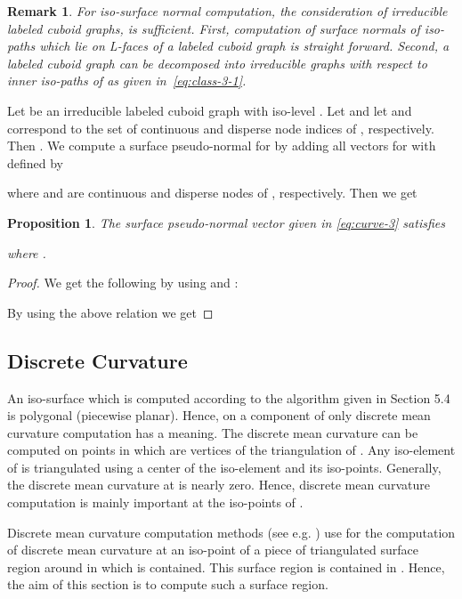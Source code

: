 \documentclass[a4paper,11pt]{article}
\newtheorem{proposition}[theorem]{Proposition}
\newtheorem{remark}[theorem]{Remark}
\begin{document}
\begin{remark} For iso-surface normal computation, the consideration of irreducible labeled cuboid graphs,
is sufficient. First, computation of surface normals of iso-paths which lie on L-faces of a labeled cuboid graph
is straight forward. Second, a labeled cuboid graph  can be decomposed into irreducible graphs with respect
to inner iso-paths of  as given in~\eqref{eq:class-3-1}.
\label{rem:second-remark}
\end{remark}

Let  be an irreducible labeled cuboid graph
with iso-level . Let  and let  and 
correspond to the set of continuous and disperse node indices of , respectively.
Then . We compute a surface pseudo-normal for  by adding all vectors
 for  with  defined by

where  and  are continuous and disperse nodes of , respectively.
Then we get

\begin{proposition}The surface pseudo-normal vector given in \eqref{eq:curve-3} satisfies

where .
\label{prop:curve-2}
\end{proposition}
\begin{proof}
We get the following by using  and  :

By using the above relation we get

\end{proof}

\subsection{Discrete Curvature}
An iso-surface  which is computed according to the algorithm given in Section 5.4 is polygonal
(piecewise planar). Hence, on a component  of  only discrete mean curvature computation
has a meaning. The discrete mean curvature can be computed on points in  which are vertices of the
triangulation of . Any iso-element of  is triangulated using a center 
of the iso-element and its iso-points. Generally, the discrete mean curvature at  is nearly zero. Hence,
discrete mean curvature computation is mainly important at the iso-points of .

Discrete mean curvature computation methods (see e.g. \cite{Meyer02Vismath}) use for the computation of
discrete mean curvature at an iso-point  of  a piece of triangulated surface region around  in
which  is contained. This surface region is contained in . Hence, the aim of this section is to
compute such a surface region.
\end{document}
